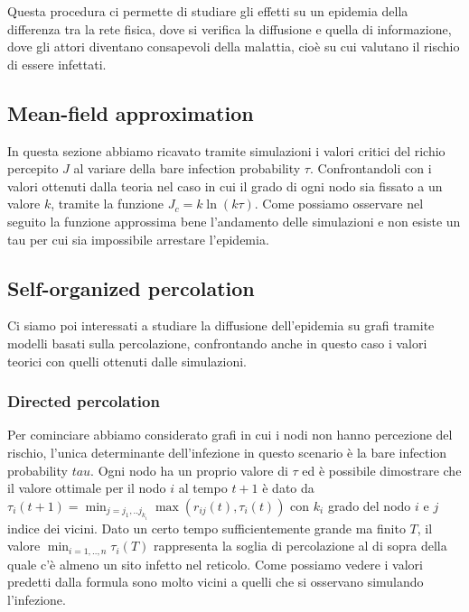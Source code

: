 Questa procedura ci permette di studiare gli effetti su un epidemia della differenza tra la rete fisica, dove si verifica la
diffusione e quella di informazione, dove gli attori diventano consapevoli della malattia,
cioè su cui valutano il rischio di essere infettati.

\subsection{Mean-field approximation}\label{subsec:mean-field-approximation}
In questa sezione abbiamo ricavato tramite simulazioni i valori critici del richio percepito $J$
al variare della bare infection probability $\tau$. Confrontandoli con i valori ottenuti dalla teoria nel caso
in cui il grado di ogni nodo sia fissato a  un valore $k$, tramite la funzione $J_{c}=k\ln(k\tau)$.
Come possiamo osservare nel seguito la funzione approssima bene l'andamento delle simulazioni e non esiste un tau per cui 
sia impossibile arrestare l'epidemia. 
\subsection{Self-organized percolation}\label{subsec:self-organized-percolation}
Ci siamo poi interessati a studiare la diffusione dell'epidemia su grafi tramite modelli basati 
sulla percolazione, confrontando anche in questo caso i valori teorici con quelli ottenuti dalle simulazioni.

\subsubsection{Directed percolation}\label{subsubsec:directed-percolation}
Per cominciare abbiamo considerato grafi in cui i nodi non hanno percezione del rischio, l'unica determinante 
dell'infezione in questo scenario è la bare infection probability $tau$. Ogni nodo ha un proprio valore di $\tau$
ed è possibile dimostrare che il valore ottimale per il nodo $i$ al tempo $t+1$ è dato da $\tau_{i}(t+1) = \min_{j= j_{1},..j_{k_{i}}}\max(r_{ij}(t), \tau_{i}(t))$
con $k_{i}$ grado del nodo $i$ e $j$ indice dei vicini.
Dato un certo tempo sufficientemente grande ma finito $T$, il valore  $\min_{i=1,..,n}\tau_{i}(T)$ 
rappresenta la soglia di percolazione al di sopra della quale c'è almeno un sito infetto nel reticolo.
Come possiamo vedere i valori predetti dalla formula sono molto vicini a quelli che si osservano simulando 
l'infezione.
